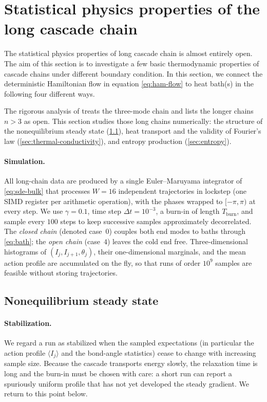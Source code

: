 \documentclass[11pt,a4paper]{article}
\theoremstyle{definition}
\numberwithin{equation}{section}   %
\begin{document}
\section{Statistical physics properties of the long cascade chain}\label{sec:long-chain}

The statistical physics properties of long cascade chain is almost entirely open. The aim of this section is to investigate a few basic thermodynamic properties of cascade chains under different boundary condition. In this section, we connect the deterministic Hamiltonian flow in equation \eqref{eq:ham-flow} to heat bath(s) in the following four different ways.



The rigorous analysis of \cite{HLNS} treats the three-mode chain and lists the
longer chains $n>3$ as open. This section studies those long chains
numerically: the structure of the nonequilibrium steady state
(\cref{sec:ness-long}), heat transport and the validity of Fourier's law
(\cref{sec:thermal-conductivity}), and entropy production
(\cref{sec:entropy}).

\paragraph{Simulation.}
All long-chain data are produced by a single Euler--Maruyama integrator of
\eqref{eq:sde-bulk} that processes $W=16$ independent trajectories in lockstep
(one SIMD register per arithmetic operation), with the phases wrapped to
$[-\pi,\pi)$ at every step. We use $\gamma=0.1$, time step $\Delta t=10^{-3}$,
a burn-in of length $T_{\mathrm{burn}}$, and sample every $100$ steps to keep
successive samples approximately decorrelated. The \emph{closed chain} (denoted
case~$0$) couples both end modes to baths through \eqref{eq:bath}; the
\emph{open chain} (case~$4$) leaves the cold end free. Three-dimensional
histograms of $(I_j,I_{j+1},\theta_j)$, their one-dimensional marginals, and the
mean action profile are accumulated on the fly, so that runs of order $10^9$
samples are feasible without storing trajectories.

\subsection{Nonequilibrium steady state}\label{sec:ness-long}

\paragraph{Stabilization.}
We regard a run as stabilized when the sampled expectations (in particular the
action profile $\langle I_j\rangle$ and the bond-angle statistics) cease to
change with increasing sample size. Because the cascade transports energy
slowly, the relaxation time is long and the burn-in must be chosen with care:
a short run can report a spuriously uniform profile that has not yet developed
the steady gradient. We return to this point below.
\end{document}
